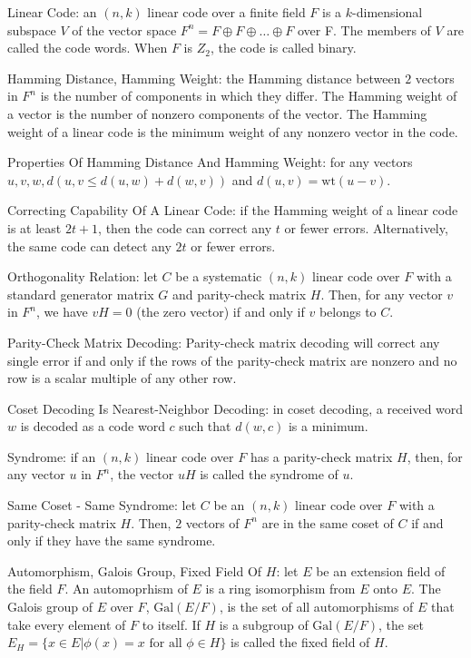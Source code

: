 Linear Code: an $(n,k)$ linear code over a finite field $F$ is a $k$-dimensional subspace $V$ of the vector space $F^n = F \oplus F \oplus \dots \oplus F$ over F. The members of $V$ are called the code words. When $F$ is $Z_2$, the code is called binary.

Hamming Distance, Hamming Weight: the Hamming distance between $2$ vectors in $F^n$ is the number of components in which they differ. The Hamming weight of a vector is the number of nonzero components of the vector. The Hamming weight of a linear code is the minimum weight of any nonzero vector in the code.

Properties Of Hamming Distance And Hamming Weight: for any vectors $u,v,w, d(u,v \le d(u,w)+d(w,v))$ and $d(u,v)=\text{wt}(u-v)$.

Correcting Capability Of A Linear Code: if the Hamming weight of a linear code is at least $2t+1$, then the code can correct any $t$ or fewer errors. Alternatively, the same code can detect any $2t$ or fewer errors.

Orthogonality Relation: let $C$ be a systematic $(n,k)$ linear code over $F$ with a standard generator matrix $G$ and parity-check matrix $H$. Then, for any vector $v$ in $F^n$, we have $vH=0$ (the zero vector) if and only if $v$ belongs to $C$.

Parity-Check Matrix Decoding: Parity-check matrix decoding will correct any single error if and only if the rows of the parity-check matrix are nonzero and no row is a scalar multiple of any other row.

Coset Decoding Is Nearest-Neighbor Decoding: in coset decoding, a received word $w$ is decoded as a code word $c$ such that $d(w,c)$ is a minimum.

Syndrome: if an $(n,k)$ linear code over $F$ has a parity-check matrix $H$, then, for any vector $u$ in $F^n$, the vector $uH$ is called the syndrome of $u$.

Same Coset - Same Syndrome: let $C$ be an $(n,k)$ linear code over $F$ with a parity-check matrix $H$. Then, $2$ vectors of $F^n$ are in the same coset of $C$ if and only if they have the same syndrome.

Automorphism, Galois Group, Fixed Field Of $H$: let $E$ be an extension field of the field $F$. An automoprhism of $E$ is a ring isomorphism from $E$ onto $E$. The Galois group of $E$ over $F$, $\text{Gal}(E/F)$, is the set of all automorphisms of $E$ that take every element of $F$ to itself. If $H$ is a subgroup of $\text{Gal}(E/F)$, the set $E_H = \{ x \in E | \phi (x)=x \text{ for all }\phi \in H \}$ is called the fixed field of $H$.

